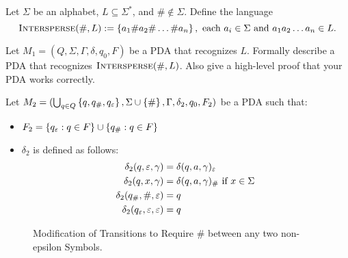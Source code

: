 \begin{problem}
  Let $\Sigma$ be an alphabet, $L \subseteq \Sigma^*$,
  and $\# \notin \Sigma$.
  Define the language
  \[ 
    \textsc{Intersperse}(\#, L) := 
    \left\{a_1 \# a_2 \# \ldots \# a_n\right\},
    \text{ each $a_i \in \Sigma$ and $a_1a_2 \ldots a_n \in L$}.
  \]

  \step
  Let $M_1 = (Q, \Sigma, \Gamma, \delta, q_0, F)$ be a PDA
  that recognizes $L$.
  Formally describe a PDA that recognizes $\textsc{Intersperse}(\#, L)$.
  Also give a high-level proof that your PDA works correctly.
\end{problem}
\begin{Answer}
  Let $M_2 = (\bigcup_{q \in Q} \left\{q, q_\#, q_\varepsilon\right\}, \Sigma \cup \left\{\#\right\}, \Gamma, \delta_2, q_0, F_2)$ be a PDA
  such that:
  \begin{itemize}
    \item $F_2 = \left\{q_\varepsilon: q \in F\right\} \cup \left\{q_\#: q \in F\right\}$
    \item $\delta_2$ is defined as follows:
    \begin{align*}
      \delta_2(q, \varepsilon, \gamma) &= \delta(q, a, \gamma)_\varepsilon \\
      \delta_2(q, x, \gamma) &= \delta(q, a, \gamma)_\# \text{ if $x \in \Sigma$} \\
      \delta_2(q_\#, \#, \varepsilon) &= q \\
      \delta_2(q_\varepsilon, \varepsilon, \varepsilon) &= q \\
    \end{align*}
  \end{itemize}
  \begin{figure}[H]
    \caption{Modification of Transitions to Require $\#$ between any two non-epsilon Symbols.}
  \end{figure}


\end{Answer}
